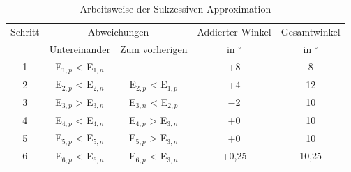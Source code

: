 	\begin{table}[h!]
		\centering
		\caption{Arbeitsweise der Sukzessiven Approximation}
		\label{tab:sar}
		\begin{tabular}{ccccc}
			\toprule
			Schritt & \multicolumn{2}{c}{Abweichungen} & Addierter Winkel & Gesamtwinkel\\
			& Untereinander & Zum vorherigen & in $^\circ$& in $^\circ$\\
			\midrule
			1 & E$_{1,p}$ < E$_{1,n}$ 	& -	& +8  & 8 \\
			2 & E$_{2,p}$ < E$_{2,n}$ 	& E$_{2,p}$ < E$_{1,p}$	& +4 & 12\\
			3 & E$_{3,p}$ > E$_{3,n}$ 	& E$_{3,n}$ < E$_{2,p}$	& $-$2  & 10 \\
			4 & E$_{4,p}$ < E$_{4,n}$ 	& E$_{4,p}$ > E$_{3,n}$	& +0  & 10 \\
			5 & E$_{5,p}$ < E$_{5,n}$ 	& E$_{5,p}$ > E$_{3,n}$	& +0  & 10 \\
			6 & E$_{6,p}$ < E$_{6,n}$ 	& E$_{6,p}$ < E$_{3,n}$	& +0,25  & 10,25 \\
			\bottomrule
		\end{tabular}
	\end{table}